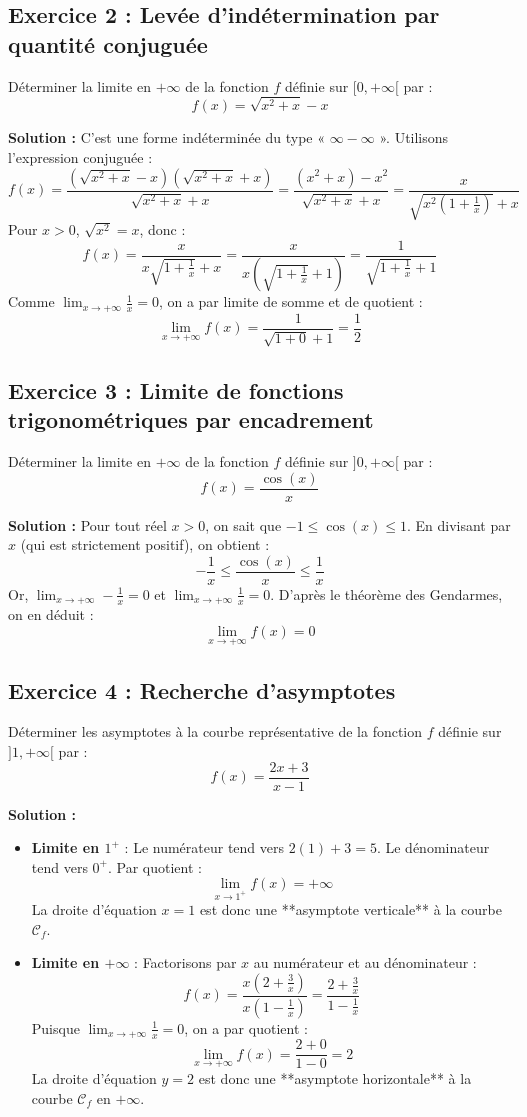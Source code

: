 \subsection*{Exercice 2 : Levée d'indétermination par quantité conjuguée}
Déterminer la limite en $+\infty$ de la fonction $f$ définie sur $[0, +\infty[$ par :
\[
f(x) = \sqrt{x^2 + x} - x
\]

\textbf{Solution :}
C'est une forme indéterminée du type « $\infty - \infty$ ». Utilisons l'expression conjuguée :
\[
f(x) = \frac{\left(\sqrt{x^2+x}-x\right)\left(\sqrt{x^2+x}+x\right)}{\sqrt{x^2+x}+x} = \frac{(x^2+x) - x^2}{\sqrt{x^2+x}+x} = \frac{x}{\sqrt{x^2\left(1 + \frac{1}{x}\right)}+x}
\]
Pour $x > 0$, $\sqrt{x^2} = x$, donc :
\[
f(x) = \frac{x}{x\sqrt{1+\frac{1}{x}}+x} = \frac{x}{x\left(\sqrt{1+\frac{1}{x}}+1\right)} = \frac{1}{\sqrt{1+\frac{1}{x}}+1}
\]
Comme $\lim_{x \to +\infty} \frac{1}{x} = 0$, on a par limite de somme et de quotient :
\[
\lim_{x \to +\infty} f(x) = \frac{1}{\sqrt{1+0}+1} = \frac{1}{2}
\]

\subsection*{Exercice 3 : Limite de fonctions trigonométriques par encadrement}
Déterminer la limite en $+\infty$ de la fonction $f$ définie sur $]0, +\infty[$ par :
\[
f(x) = \frac{\cos(x)}{x}
\]

\textbf{Solution :}
Pour tout réel $x > 0$, on sait que $-1 \le \cos(x) \le 1$.
En divisant par $x$ (qui est strictement positif), on obtient :
\[
-\frac{1}{x} \le \frac{\cos(x)}{x} \le \frac{1}{x}
\]
Or, $\lim_{x \to +\infty} -\frac{1}{x} = 0$ et $\lim_{x \to +\infty} \frac{1}{x} = 0$.
D'après le théorème des Gendarmes, on en déduit :
\[
\lim_{x \to +\infty} f(x) = 0
\]

\subsection*{Exercice 4 : Recherche d'asymptotes}
Déterminer les asymptotes à la courbe représentative de la fonction $f$ définie sur $]1, +\infty[$ par :
\[
f(x) = \frac{2x+3}{x-1}
\]

\textbf{Solution :}
\begin{itemize}
    \item \textbf{Limite en $1^+$} : Le numérateur tend vers $2(1)+3 = 5$. Le dénominateur tend vers $0^+$. Par quotient :
    \[
    \lim_{x \to 1^+} f(x) = +\infty
    \]
    La droite d'équation $x = 1$ est donc une **asymptote verticale** à la courbe $\mathcal{C}_f$.
    
    \item \textbf{Limite en $+\infty$} : Factorisons par $x$ au numérateur et au dénominateur :
    \[
    f(x) = \frac{x\left(2 + \frac{3}{x}\right)}{x\left(1 - \frac{1}{x}\right)} = \frac{2 + \frac{3}{x}}{1 - \frac{1}{x}}
    \]
    Puisque $\lim_{x \to +\infty} \frac{1}{x} = 0$, on a par quotient :
    \[
    \lim_{x \to +\infty} f(x) = \frac{2+0}{1-0} = 2
    \]
    La droite d'équation $y = 2$ est donc une **asymptote horizontale** à la courbe $\mathcal{C}_f$ en $+\infty$.
\end{itemize}

